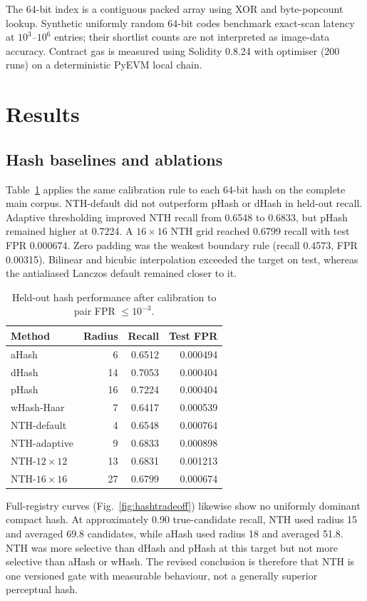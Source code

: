 \documentclass[12pt]{article}
\begin{document}
The 64-bit index is a contiguous packed array using XOR and byte-popcount lookup. Synthetic uniformly random 64-bit codes benchmark exact-scan latency at $10^3$--$10^6$ entries; their shortlist counts are not interpreted as image-data accuracy. Contract gas is measured using Solidity 0.8.24 with optimiser (200 runs) on a deterministic PyEVM local chain.

\section{Results}

\subsection{Hash baselines and ablations}

Table~\ref{tab:hashes} applies the same calibration rule to each 64-bit hash on the complete main corpus. NTH-default did not outperform pHash or dHash in held-out recall. Adaptive thresholding improved NTH recall from 0.6548 to 0.6833, but pHash remained higher at 0.7224. A $16\times16$ NTH grid reached 0.6799 recall with test FPR 0.000674. Zero padding was the weakest boundary rule (recall 0.4573, FPR 0.00315). Bilinear and bicubic interpolation exceeded the target on test, whereas the antialiased Lanczos default remained closer to it.

\begin{table}[ht]
\centering
\caption{Held-out hash performance after calibration to pair FPR $\leq10^{-3}$.}
\label{tab:hashes}
\begin{tabular}{lrrr}
\toprule
Method & Radius & Recall & Test FPR\\
\midrule
aHash & 6 & 0.6512 & 0.000494\\
dHash & 14 & 0.7053 & 0.000404\\
pHash & 16 & 0.7224 & 0.000404\\
wHash-Haar & 7 & 0.6417 & 0.000539\\
NTH-default & 4 & 0.6548 & 0.000764\\
NTH-adaptive & 9 & 0.6833 & 0.000898\\
NTH-$12\times12$ & 13 & 0.6831 & 0.001213\\
NTH-$16\times16$ & 27 & 0.6799 & 0.000674\\
\bottomrule
\end{tabular}
\end{table}

Full-registry curves (Fig.~\ref{fig:hashtradeoff}) likewise show no uniformly dominant compact hash. At approximately 0.90 true-candidate recall, NTH used radius 15 and averaged 69.8 candidates, while aHash used radius 18 and averaged 51.8. NTH was more selective than dHash and pHash at this target but not more selective than aHash or wHash. The revised conclusion is therefore that NTH is one versioned gate with measurable behaviour, not a generally superior perceptual hash.
\end{document}
